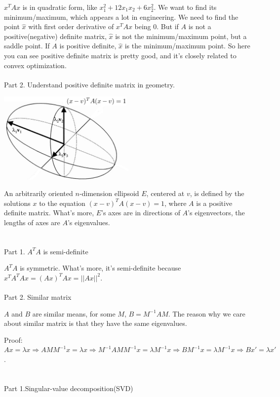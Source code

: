 \documentclass{article}
\begin{document}
\begin{spacing}{1.5}
$x^TAx$ is in quadratic form, like $x_1^2+12x_1x_2+6x_2^2$. We want to find its minimum/maximum, which appears a lot in engineering. We need to find the point $\hat x$ with first order derivative of $x^TAx$ being 0. But if $A$ is not a positive(negative) definite matrix, $\hat x$ is not the minimum/maximum point, but a saddle point. If $A$ is positive definite, $\hat x$ is the minimum/maximum point. So here you can see positive definite matrix is pretty good, and it's closely related to convex optimization.
\\\\Part 2. Understand positive definite matrix in geometry.
\\\begin{center}
\includegraphics[width=0.5\textwidth]{ellipsoid_eigenvalues.png}
\end{center}

An arbitrarily oriented $n$-dimension ellipsoid $E$, centered at $v$, is defined by the solutions $x$ to the equation $(x-v)^TA(x-v)=1$, where $A$ is a positive definite matrix. What's more, $E$'s axes are in directions of $A$'s eigenvectors, the lengths of axes are $A$'s eigenvalues.


\section{}
Part 1. $A^TA$ is semi-definite

$A^TA$ is symmetric. What's more, it's semi-definite because $x^TA^TAx=(Ax)^TAx=||Ax||^2$.
\\\\ Part 2. Similar matrix

$A$ and $B$ are similar means, for some $M$, $B=M^{-1}AM$. The reason why we care about similar matrix is that they have the same eigenvalues. 

Proof: $Ax=\lambda x \Rightarrow AMM^{-1}x=\lambda x \Rightarrow M^{-1}AMM^{-1}x=\lambda M^{-1}x \Rightarrow BM^{-1}x=\lambda M^{-1}x \Rightarrow Bx'=\lambda x'$.


\section{}
Part 1.Singular-value decomposition(SVD)


\end{spacing}
\end{document}
